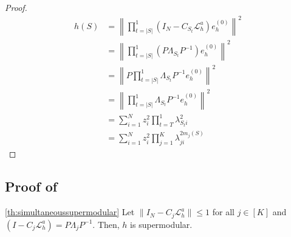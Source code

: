 \documentclass{article} %
\begin{document}
\begin{proof}

\begin{align*}
    h(S) &= \left\|\prod_{t = |S|}^1\left(I_N - C_{S_t} \mathcal{L}_{h}^a\right)  e^{(0)}_h \right\|^2 \\
    &=  \left\|\prod_{t = |S|}^1\left(P\Lambda_{S_t}P^{-1}\right)  e^{(0)}_h \right\|^2 \\
    &=  \left\|P\prod_{t = |S|}^1\Lambda_{S_t}P^{-1}  e^{(0)}_h \right\|^2 \\
    &= \left\|\prod_{t = |S|}^1\Lambda_{S_t}P^{-1}  e^{(0)}_h \right\|^2\\
    &=  \sum_{i = 1}^N z_i^2 \prod_{t = T}^1 \lambda_{S_ti}^2 \\
    &=  \sum_{i = 1}^N z_i^2 \prod_{j = 1}^K \lambda_{ji}^{2m_j(S)} 
\end{align*}

\end{proof}

\subsection{Proof of } \label{sec:proofsimultaneoussupermodular}
\begin{customproposition}{\ref{th:simultaneoussupermodular}}
    Let $\|I_N - C_j\mathcal{L}_h^a\| \leq 1$ for all $j \in [K]$ and $\left(I - C_j \mathcal{L}_{h}^a\right) = P\Lambda_jP^{-1}$. Then, $h$ is supermodular. 
\end{customproposition}
\end{document}
